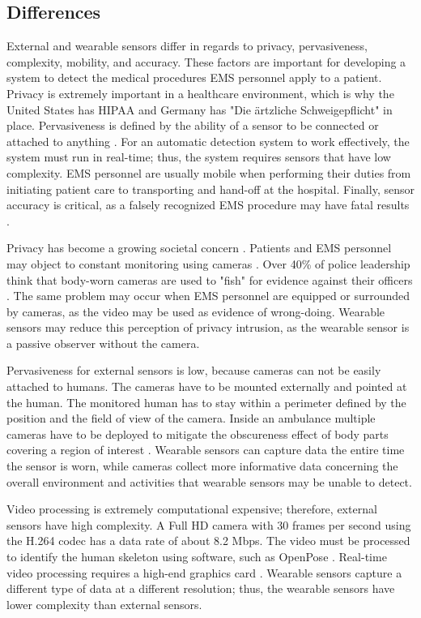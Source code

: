 \subsection{Differences}
External and wearable sensors differ in regards to privacy, pervasiveness, complexity, mobility, and accuracy. These factors are important for developing a system to detect the medical procedures EMS personnel apply to a patient. Privacy is extremely important in a healthcare environment, which is why the United States has HIPAA \cite{HIPAA} and Germany has "Die \"artzliche Schweigepflicht" \cite{Privatgeheimnissen} in place. Pervasiveness is defined by the ability of a sensor to be connected or attached to anything \cite{Lara2013}. For an automatic detection system to work effectively, the system must run in real-time; thus, the system requires sensors that have low complexity. EMS personnel are usually mobile when performing their duties from initiating patient care to transporting and hand-off at the hospital. Finally, sensor accuracy is critical, as a falsely recognized EMS procedure may have fatal results \cite{mourcou2015performance}.
\par Privacy has become a growing societal concern \cite{privacyindex}. Patients and EMS personnel may object to constant monitoring using cameras \cite{Arning2015}. Over 40\% of police leadership think that body-worn cameras are used to "fish" for evidence against their officers \cite{Smykla2016}. The same problem may occur when EMS personnel are equipped or surrounded by cameras, as the video may be used as evidence of wrong-doing. Wearable sensors may reduce this perception of privacy intrusion, as the wearable sensor is a passive observer without the camera.
\par Pervasiveness for external sensors is low, because cameras can not be easily attached to humans. The cameras have to be mounted externally and pointed at the human. The monitored human has to stay within a perimeter defined by the position and the field of view of the camera. Inside an ambulance multiple cameras have to be deployed to mitigate the obscureness effect of body parts covering a region of interest \cite{howe2000bayesian}. Wearable sensors can capture data the entire time the sensor is worn, while cameras collect more informative data concerning the overall environment and activities that wearable sensors may be unable to detect.
\par Video processing is extremely computational expensive; therefore, external sensors have high complexity. A Full HD camera with 30 frames per second using the H.264 codec has a data rate of about 8.2 Mbps. The video must be processed to identify the human skeleton using software, such as OpenPose \cite{openpose}. Real-time video processing requires a high-end graphics card \cite{732851}. Wearable sensors capture a different type of data at a different resolution; thus, the wearable sensors have lower complexity than external sensors.
